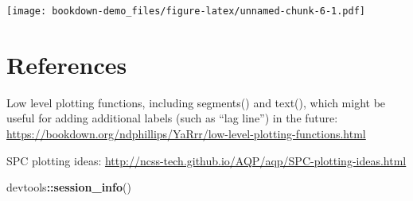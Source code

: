\documentclass[
]{book}
\newenvironment{Shaded}{\begin{snugshade}}{\end{snugshade}}
\newcommand{\KeywordTok}[1]{\textcolor[rgb]{0.13,0.29,0.53}{\textbf{#1}}}
\newcommand{\NormalTok}[1]{#1}
\newcommand{\OperatorTok}[1]{\textcolor[rgb]{0.81,0.36,0.00}{\textbf{#1}}}
\begin{document}
\texttt{[image: bookdown-demo\_files/figure-latex/unnamed-chunk-6-1.pdf]}

\hypertarget{references}{%
\chapter{References}\label{references}}

Low level plotting functions, including segments() and text(), which might be useful for adding additional labels (such as ``lag line'') in the future: \url{https://bookdown.org/ndphillips/YaRrr/low-level-plotting-functions.html}

SPC plotting ideas:
\url{http://ncss-tech.github.io/AQP/aqp/SPC-plotting-ideas.html}

\begin{Shaded}
\begin{Highlighting}[]
\NormalTok{devtools}\OperatorTok{::}\KeywordTok{session\_info}\NormalTok{()}
\end{Highlighting}
\end{Shaded}
\end{document}
